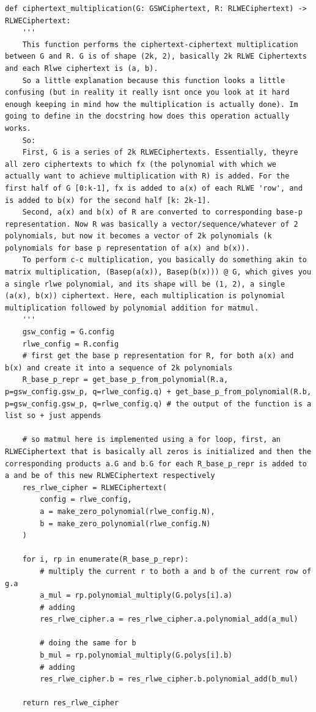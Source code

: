 \documentclass{report}
\begin{document}
	\begin{verbatim}
def ciphertext_multiplication(G: GSWCiphertext, R: RLWECiphertext) -> RLWECiphertext:
	'''
	This function performs the ciphertext-ciphertext multiplication between G and R. G is of shape (2k, 2), basically 2k RLWE Ciphertexts and each Rlwe ciphertext is (a, b).
	So a little explanation because this function looks a little confusing (but in reality it really isnt once you look at it hard enough keeping in mind how the multiplication is actually done). Im going to define in the docstring how does this operation actually works. 
	So:
	First, G is a series of 2k RLWECiphertexts. Essentially, theyre all zero ciphertexts to which fx (the polynomial with which we actually want to achieve multiplication with R) is added. For the first half of G [0:k-1], fx is added to a(x) of each RLWE 'row', and is added to b(x) for the second half [k: 2k-1].
	Second, a(x) and b(x) of R are converted to corresponding base-p representation. Now R was basically a vector/sequence/whatever of 2 polynomials, but now it becomes a vector of 2k polynomials (k polynomials for base p representation of a(x) and b(x)). 
	To perform c-c multiplication, you basically do something akin to matrix multiplication, (Basep(a(x)), Basep(b(x))) @ G, which gives you a single rlwe polynomial, and its shape will be (1, 2), a single (a(x), b(x)) ciphertext. Here, each multiplication is polynomial multiplication followed by polynomial addition for matmul.
	'''
	gsw_config = G.config
	rlwe_config = R.config
	# first get the base p representation for R, for both a(x) and b(x) and create it into a sequence of 2k polynomials
	R_base_p_repr = get_base_p_from_polynomial(R.a, p=gsw_config.gsw_p, q=rlwe_config.q) + get_base_p_from_polynomial(R.b, p=gsw_config.gsw_p, q=rlwe_config.q) # the output of the function is a list so + just appends
	
	# so matmul here is implemented using a for loop, first, an RLWECiphertext that is basically all zeros is initialized and then the corresponding products a.G and b.G for each R_base_p_repr is added to a and be of this new RLWECiphertext respectively
	res_rlwe_cipher = RLWECiphertext(
		config = rlwe_config,
		a = make_zero_polynomial(rlwe_config.N),
		b = make_zero_polynomial(rlwe_config.N)
	)
	
	for i, rp in enumerate(R_base_p_repr):
		# multiply the current r to both a and b of the current row of g.a
		a_mul = rp.polynomial_multiply(G.polys[i].a)
		# adding
		res_rlwe_cipher.a = res_rlwe_cipher.a.polynomial_add(a_mul)
		
		# doing the same for b
		b_mul = rp.polynomial_multiply(G.polys[i].b)
		# adding
		res_rlwe_cipher.b = res_rlwe_cipher.b.polynomial_add(b_mul)
	
	return res_rlwe_cipher
	\end{verbatim}
	
\end{document}
